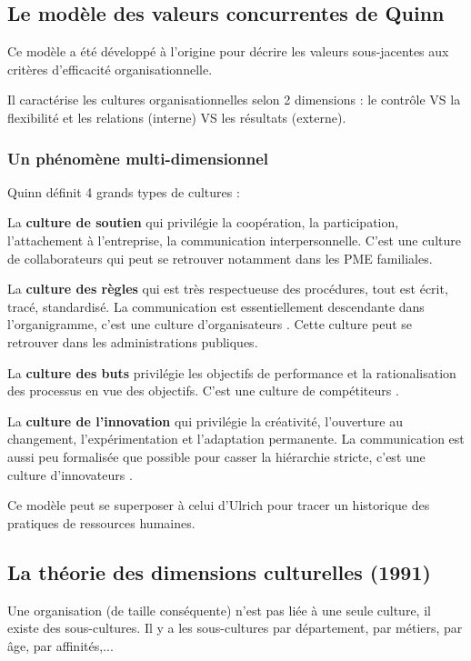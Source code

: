 \documentclass[12pt]{article}
\begin{document}
      \subsection{Le modèle des valeurs concurrentes de Quinn}
	Ce modèle a été développé à l'origine pour décrire les valeurs sous-jacentes aux critères d'efficacité organisationnelle.
	
	Il caractérise les cultures organisationnelles selon 2 dimensions : le contrôle VS la flexibilité et les relations (interne) VS les résultats (externe).
	
	\subsubsection{Un phénomène multi-dimensionnel}
	
	  Quinn définit 4 grands types de cultures :
	  
	  La \textbf{culture de soutien} qui privilégie la coopération, la participation, l'attachement à l'entreprise, la communication interpersonnelle. C'est une culture de \og{} collaborateurs \fg{} qui peut se retrouver notamment dans les PME familiales.
	  
	  La \textbf{culture des règles} qui est très respectueuse des procédures, tout est écrit, tracé, standardisé. La communication est essentiellement descendante dans l'organigramme, c'est une culture \og{} d'organisateurs \fg{}. Cette culture peut se retrouver dans les administrations publiques.
	  
	  La \textbf{culture des buts} privilégie les objectifs de performance et la rationalisation des processus en vue des objectifs. C'est une culture de \og{} compétiteurs \fg{}. 
	  
	  La \textbf{culture de l'innovation} qui privilégie la créativité, l'ouverture au changement, l'expérimentation et l'adaptation permanente. La communication est aussi peu formalisée que possible pour casser la hiérarchie stricte, c'est une culture \og{} d'innovateurs \fg{}.
	  
	  Ce modèle peut se superposer à celui d'Ulrich pour tracer un historique des pratiques de ressources humaines.
	
	\subsection{La théorie des dimensions culturelles (1991)}
	
	Une organisation (de taille conséquente) n'est pas liée à une seule culture, il existe des sous-cultures. Il y a les sous-cultures par département, par métiers, par âge, par affinités,...
	
\end{document}
